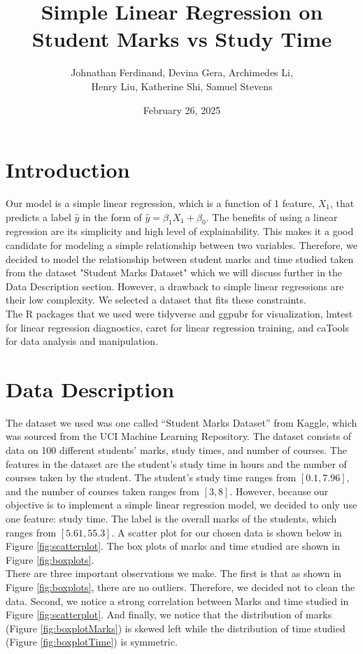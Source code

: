 \documentclass{article}
\title{Simple Linear Regression on Student Marks vs Study Time}
\author{Johnathan Ferdinand, Devina Gera, Archimedes Li, \\ Henry Liu, Katherine Shi, Samuel Stevens}
\date{February 26, 2025}
\begin{document}
\maketitle

\section{Introduction}
Our model is a simple linear regression, which is a function of 1 feature, $X_1$, that predicts a label $\hat{y}$ in the form of $\hat{y} = \beta_1X_1 + \beta_0$.  
The benefits of using a linear regression are its simplicity and high level of explainability.  
This makes it a good candidate for modeling a simple relationship between two variables.  
Therefore, we decided to model the relationship between student marks and time studied taken from the dataset "Student Marks Dataset" which we will discuss further in the Data Description section.
However, a drawback to simple linear regressions are their low complexity.  We selected a dataset that fits these constraints. \\

\noindent The R packages that we used were tidyverse and ggpubr for visualization, lmtest for linear regression diagnostics, caret for linear regression training, and caTools for data analysis and manipulation.

\section{Data Description}
The dataset we used was one called “Student Marks Dataset” from Kaggle, which was sourced from the UCI Machine Learning Repository. The dataset consists of data on 100 different students' marks, study times, and number of courses.  
The features in the dataset are the student’s study time in hours and the number of courses taken by the student.  
The student’s study time ranges from $[0.1, 7.96]$, and the number of courses taken ranges from $[3, 8]$. 
However, because our objective is to implement a simple linear regression model, we decided to only use one feature: study time.
The label is the overall marks of the students, which ranges from $[5.61, 55.3]$.  
A scatter plot for our chosen data is shown below in Figure \ref{fig:scatterplot}. 
The box plots of marks and time studied are shown in Figure \ref{fig:boxplots}. \\

\noindent There are three important observations we make. The first is that as shown in Figure \ref{fig:boxplots}, there are no outliers. Therefore, we decided not to clean the data.
Second, we notice a strong correlation between Marks and time studied in Figure \ref{fig:scatterplot}. 
And finally, we notice that the distribution of marks (Figure \ref{fig:boxplotMarks}) is skewed left while the distribution of time studied (Figure \ref{fig:boxplotTime}) is symmetric.
\end{document}
